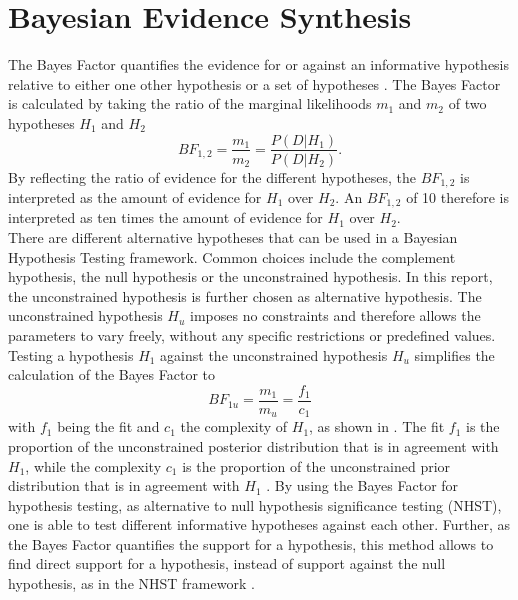 \documentclass[12pt]{article}
\begin{document}
\section{Bayesian Evidence Synthesis}
The Bayes Factor quantifies the evidence for or against an informative hypothesis relative to either one other hypothesis or a set of hypotheses \citep{hoijtink_tutorial_2019}. The Bayes Factor is calculated by taking the ratio of the marginal likelihoods $m_1$ and $m_2$ of two hypotheses $H_1$ and $H_2$ \citep{chib_marginal_1995, kass_bayes_1995}
\begin{equation}
    BF_{1,2} = \frac{m_1}{m_2} = \frac{P(D|H_1)}{P(D|H_2)}.
\end{equation}
By reflecting the ratio of evidence for the different hypotheses, the $BF_{1,2}$ is interpreted as the amount of evidence for $H_1$ over $H_2$. An $BF_{1,2}$ of 10 therefore is interpreted as ten times the amount of evidence for $H_1$ over $H_2$. \\
There are different alternative hypotheses that can be used in a Bayesian Hypothesis Testing framework. Common choices include the complement hypothesis, the null hypothesis or the unconstrained hypothesis. In this report, the unconstrained hypothesis is further chosen as alternative hypothesis. The unconstrained hypothesis $H_u$ imposes no constraints and therefore allows the parameters to vary freely, without any specific restrictions or predefined values. Testing a hypothesis $H_1$ against the unconstrained hypothesis $H_u$ simplifies the calculation of the Bayes Factor to 
\begin{equation}
    BF_{1u} = \frac{m_1}{m_u} = \frac{f_1}{c_1}
\end{equation}
with $f_1$ being the fit and $c_1$ the complexity of $H_1$, as shown in \citet{klugkist_inequality_2005}. The fit $f_1$ is the proportion of the unconstrained posterior distribution that is in agreement with $H_1$, while the complexity $c_1$ is the proportion of the unconstrained prior distribution that is in agreement with $H_1$ \citep{hoijtink_informative_2011}. By using the Bayes Factor for hypothesis testing, as alternative to null hypothesis significance testing (NHST), one is able to test different informative hypotheses against each other. Further, as the Bayes Factor quantifies the support for a hypothesis, this method allows to find direct support for a hypothesis, instead of support against the null hypothesis, as in the NHST framework \citep{hoijtink_tutorial_2019}. \\
\end{document}
